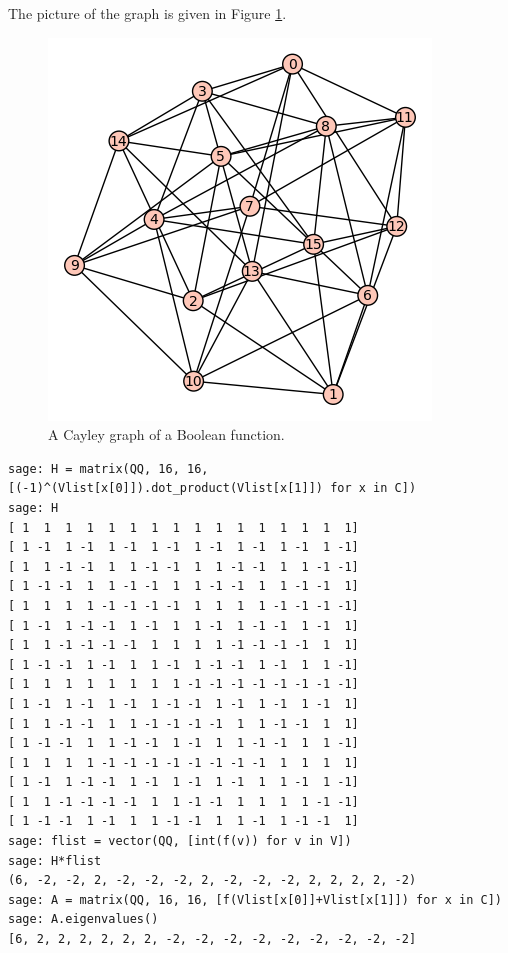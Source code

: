 The picture of the graph is given in Figure \ref{fig:distance_connectivity:bent-fcns-cayley-graphs1}.

\begin{figure}[!htbp]
\centering
{}
\includegraphics{image/distance-connectivity/bent-fcns-cayley-graphs1}
\caption{A Cayley graph of a Boolean function.}
\label{fig:distance_connectivity:bent-fcns-cayley-graphs1}
\end{figure}
 
\begin{lstlisting}
sage: H = matrix(QQ, 16, 16, [(-1)^(Vlist[x[0]]).dot_product(Vlist[x[1]]) for x in C])
sage: H
[ 1  1  1  1  1  1  1  1  1  1  1  1  1  1  1  1]
[ 1 -1  1 -1  1 -1  1 -1  1 -1  1 -1  1 -1  1 -1]
[ 1  1 -1 -1  1  1 -1 -1  1  1 -1 -1  1  1 -1 -1]
[ 1 -1 -1  1  1 -1 -1  1  1 -1 -1  1  1 -1 -1  1]
[ 1  1  1  1 -1 -1 -1 -1  1  1  1  1 -1 -1 -1 -1]
[ 1 -1  1 -1 -1  1 -1  1  1 -1  1 -1 -1  1 -1  1]
[ 1  1 -1 -1 -1 -1  1  1  1  1 -1 -1 -1 -1  1  1]
[ 1 -1 -1  1 -1  1  1 -1  1 -1 -1  1 -1  1  1 -1]
[ 1  1  1  1  1  1  1  1 -1 -1 -1 -1 -1 -1 -1 -1]
[ 1 -1  1 -1  1 -1  1 -1 -1  1 -1  1 -1  1 -1  1]
[ 1  1 -1 -1  1  1 -1 -1 -1 -1  1  1 -1 -1  1  1]
[ 1 -1 -1  1  1 -1 -1  1 -1  1  1 -1 -1  1  1 -1]
[ 1  1  1  1 -1 -1 -1 -1 -1 -1 -1 -1  1  1  1  1]
[ 1 -1  1 -1 -1  1 -1  1 -1  1 -1  1  1 -1  1 -1]
[ 1  1 -1 -1 -1 -1  1  1 -1 -1  1  1  1  1 -1 -1]
[ 1 -1 -1  1 -1  1  1 -1 -1  1  1 -1  1 -1 -1  1]
sage: flist = vector(QQ, [int(f(v)) for v in V])
sage: H*flist
(6, -2, -2, 2, -2, -2, -2, 2, -2, -2, -2, 2, 2, 2, 2, -2)
sage: A = matrix(QQ, 16, 16, [f(Vlist[x[0]]+Vlist[x[1]]) for x in C])
sage: A.eigenvalues()
[6, 2, 2, 2, 2, 2, 2, -2, -2, -2, -2, -2, -2, -2, -2, -2]
\end{lstlisting}

